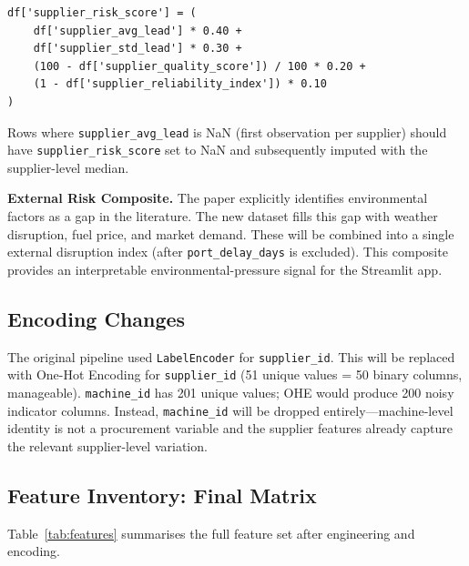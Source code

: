 \documentclass[11pt,a4paper]{article}
\begin{document}
\begin{tcolorbox}[infobox, title={Supplier Risk Score --- Implementation Spec}]
\begin{verbatim}
df['supplier_risk_score'] = (
    df['supplier_avg_lead'] * 0.40 +
    df['supplier_std_lead'] * 0.30 +
    (100 - df['supplier_quality_score']) / 100 * 0.20 +
    (1 - df['supplier_reliability_index']) * 0.10
)
\end{verbatim}
Rows where \texttt{supplier\_avg\_lead} is NaN (first observation per supplier) should
have \texttt{supplier\_risk\_score} set to NaN and subsequently imputed with the
supplier-level median.
\end{tcolorbox}

\textbf{External Risk Composite.} The paper explicitly identifies environmental factors
as a gap in the literature. The new dataset fills this gap with weather disruption,
fuel price, and market demand. These will be combined into a single external disruption
index (after \texttt{port\_delay\_days} is excluded). This composite provides an
interpretable environmental-pressure signal for the Streamlit app.

\subsection{Encoding Changes}

The original pipeline used \texttt{LabelEncoder} for \texttt{supplier\_id}. This will
be replaced with One-Hot Encoding for \texttt{supplier\_id} (51 unique values = 50
binary columns, manageable). \texttt{machine\_id} has 201 unique values; OHE would
produce 200 noisy indicator columns. Instead, \texttt{machine\_id} will be dropped
entirely---machine-level identity is not a procurement variable and the supplier
features already capture the relevant supplier-level variation.

\subsection{Feature Inventory: Final Matrix}

Table~\ref{tab:features} summarises the full feature set after engineering and encoding.
\end{document}
